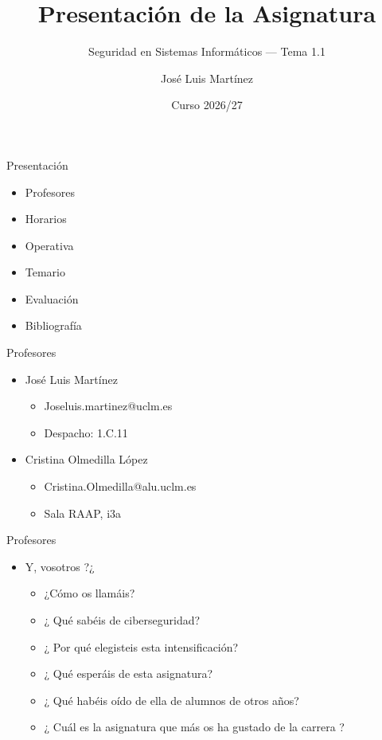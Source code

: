 \documentclass[aspectratio=169,11pt]{beamer}
\title[SSI -- Tema 1.1]{Presentación de la Asignatura}
\subtitle{Seguridad en Sistemas Informáticos --- Tema 1.1}
\author{José Luis Martínez}
\institute{Universidad de Castilla-La Mancha}
\date{Curso 2026/27}
\begin{document}
\begin{frame}[plain]
  \titlepage
\end{frame}

\begin{frame}[allowframebreaks]{Presentación}
\small
\begin{itemize}
  \item Profesores
  \item Horarios
  \item Operativa
  \item Temario
  \item Evaluación
  \item Bibliografía
\end{itemize}
\end{frame}

\begin{frame}[allowframebreaks]{Profesores}
\small
\begin{itemize}
  \item José Luis Martínez
  \begin{itemize}
    \item Joseluis.martinez@uclm.es
    \item Despacho: 1.C.11
  \end{itemize}
  \item Cristina Olmedilla López
  \begin{itemize}
    \item Cristina.Olmedilla@alu.uclm.es
    \item Sala RAAP, i3a
  \end{itemize}
\end{itemize}
\end{frame}

\begin{frame}[allowframebreaks]{Profesores}
\small
\begin{itemize}
  \item Y, vosotros ?¿
  \begin{itemize}
    \item ¿Cómo os llamáis?
    \item ¿ Qué sabéis de ciberseguridad?
    \item ¿ Por qué elegisteis esta intensificación?
    \item ¿ Qué esperáis de esta asignatura?
    \item ¿ Qué habéis oído de ella de alumnos de otros años?
    \item ¿ Cuál es la asignatura que más os ha gustado de la carrera ?
  \end{itemize}
\end{itemize}
\end{frame}
\end{document}
